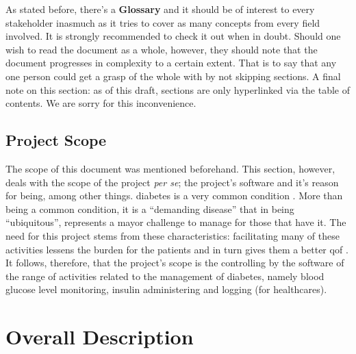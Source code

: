 \documentclass{scrreprt}
\begin{document}
As stated before, there's a \textbf{Glossary} and it should be of interest to every \gls{stakeholder} inasmuch as it tries to cover as many concepts from every field involved. It is strongly recommended to check 
it out when in doubt. Should one wish to read the document as a whole, however, they should note that the document progresses in complexity to a certain extent. That is to say that any one person could get a grasp of 
the whole with by not skipping sections. A final note on this section: as of this draft, sections are only hyperlinked via the table of contents. We are sorry for this inconvenience.

\section{Project Scope}
The scope of this document was mentioned beforehand. This section, however, deals with the scope of the project \textsl{per se}; the project's software and it's reason for being, among other things. \Gls{diabetes} is 
a very common condition \cite{sommerville}. More than being a common condition, it is a “demanding disease” that in being “ubiquitous”, represents a mayor challenge to manage for those that have it. The need for this 
project stems from these characteristics: facilitating many of these activities lessens the burden for the \glspl{patient} and in turn gives them a better \gls{qof} \cite{rubin}. It follows, therefore,
that the project's scope is the controlling by the software of the range of activities related to the management of \gls{diabetes}, namely blood \gls{glucose} level monitoring, \gls{insulin} administering and logging 
(for \glspl{healthcare}).

\chapter{Overall Description}
\end{document}
